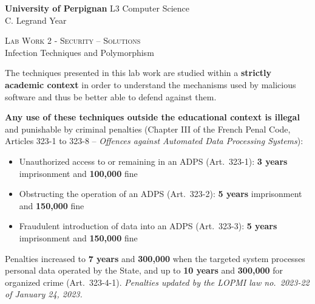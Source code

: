\documentclass[a4paper,11pt]{article}
\theoremstyle{plain}
\theoremstyle{definition}
\begin{document}
\hbox{}
\noindent \textbf{University of Perpignan} \hfill  L3 Computer Science \\
 \hfill C. Legrand \hfill  Year \the\year \\
\smallskip
\begin{center}
{
  {\scshape \large Lab Work 2 - Security -- Solutions}  \\
 Infection Techniques and Polymorphism
}
\end{center}
\hbox{}

\bigskip

\begin{ethique}
The techniques presented in this lab work are studied within a \textbf{strictly academic context} in order to understand the mechanisms used by malicious software and thus be better able to defend against them.

\textbf{Any use of these techniques outside the educational context is illegal} and punishable by criminal penalties (Chapter III of the French Penal Code, Articles 323-1 to 323-8 -- \textit{Offences against Automated Data Processing Systems}):
\begin{itemize}
    \item Unauthorized access to or remaining in an ADPS (Art.~323-1): \textbf{3 years} imprisonment and \textbf{\texteuro{}100,000} fine
    \item Obstructing the operation of an ADPS (Art.~323-2): \textbf{5 years} imprisonment and \textbf{\texteuro{}150,000} fine
    \item Fraudulent introduction of data into an ADPS (Art.~323-3): \textbf{5 years} imprisonment and \textbf{\texteuro{}150,000} fine
\end{itemize}
Penalties increased to \textbf{7 years} and \textbf{\texteuro{}300,000} when the targeted system processes personal data operated by the State, and up to \textbf{10 years} and \textbf{\texteuro{}300,000} for organized crime (Art.~323-4-1). \textit{Penalties updated by the LOPMI law no.~2023-22 of January 24, 2023.}
\end{ethique}

\bigskip

\end{document}
